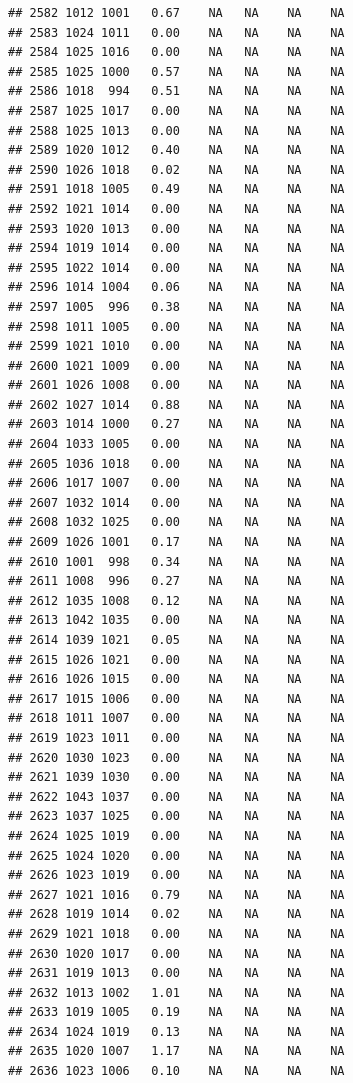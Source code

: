 \documentclass{article}\usepackage{graphicx, color}
\makeatletter
\newenvironment{kframe}{%
 \def\at@end@of@kframe{}%
 \ifinner\ifhmode%
  \def\at@end@of@kframe{\end{minipage}}%
  \begin{minipage}{\columnwidth}%
 \fi\fi%
 \def\FrameCommand##1{\hskip\@totalleftmargin \hskip-\fboxsep
 \colorbox{shadecolor}{##1}\hskip-\fboxsep
     \hskip-\linewidth \hskip-\@totalleftmargin \hskip\columnwidth}%
 \MakeFramed {\advance\hsize-\width
   \@totalleftmargin\z@ \linewidth\hsize
   \@setminipage}}%
 {\par\unskip\endMakeFramed%
 \at@end@of@kframe}
\newenvironment{knitrout}{}{} %
\makeatother
\begin{document}
\begin{knitrout}
\begin{kframe}
\begin{verbatim}
## 2582 1012 1001   0.67    NA   NA    NA    NA
## 2583 1024 1011   0.00    NA   NA    NA    NA
## 2584 1025 1016   0.00    NA   NA    NA    NA
## 2585 1025 1000   0.57    NA   NA    NA    NA
## 2586 1018  994   0.51    NA   NA    NA    NA
## 2587 1025 1017   0.00    NA   NA    NA    NA
## 2588 1025 1013   0.00    NA   NA    NA    NA
## 2589 1020 1012   0.40    NA   NA    NA    NA
## 2590 1026 1018   0.02    NA   NA    NA    NA
## 2591 1018 1005   0.49    NA   NA    NA    NA
## 2592 1021 1014   0.00    NA   NA    NA    NA
## 2593 1020 1013   0.00    NA   NA    NA    NA
## 2594 1019 1014   0.00    NA   NA    NA    NA
## 2595 1022 1014   0.00    NA   NA    NA    NA
## 2596 1014 1004   0.06    NA   NA    NA    NA
## 2597 1005  996   0.38    NA   NA    NA    NA
## 2598 1011 1005   0.00    NA   NA    NA    NA
## 2599 1021 1010   0.00    NA   NA    NA    NA
## 2600 1021 1009   0.00    NA   NA    NA    NA
## 2601 1026 1008   0.00    NA   NA    NA    NA
## 2602 1027 1014   0.88    NA   NA    NA    NA
## 2603 1014 1000   0.27    NA   NA    NA    NA
## 2604 1033 1005   0.00    NA   NA    NA    NA
## 2605 1036 1018   0.00    NA   NA    NA    NA
## 2606 1017 1007   0.00    NA   NA    NA    NA
## 2607 1032 1014   0.00    NA   NA    NA    NA
## 2608 1032 1025   0.00    NA   NA    NA    NA
## 2609 1026 1001   0.17    NA   NA    NA    NA
## 2610 1001  998   0.34    NA   NA    NA    NA
## 2611 1008  996   0.27    NA   NA    NA    NA
## 2612 1035 1008   0.12    NA   NA    NA    NA
## 2613 1042 1035   0.00    NA   NA    NA    NA
## 2614 1039 1021   0.05    NA   NA    NA    NA
## 2615 1026 1021   0.00    NA   NA    NA    NA
## 2616 1026 1015   0.00    NA   NA    NA    NA
## 2617 1015 1006   0.00    NA   NA    NA    NA
## 2618 1011 1007   0.00    NA   NA    NA    NA
## 2619 1023 1011   0.00    NA   NA    NA    NA
## 2620 1030 1023   0.00    NA   NA    NA    NA
## 2621 1039 1030   0.00    NA   NA    NA    NA
## 2622 1043 1037   0.00    NA   NA    NA    NA
## 2623 1037 1025   0.00    NA   NA    NA    NA
## 2624 1025 1019   0.00    NA   NA    NA    NA
## 2625 1024 1020   0.00    NA   NA    NA    NA
## 2626 1023 1019   0.00    NA   NA    NA    NA
## 2627 1021 1016   0.79    NA   NA    NA    NA
## 2628 1019 1014   0.02    NA   NA    NA    NA
## 2629 1021 1018   0.00    NA   NA    NA    NA
## 2630 1020 1017   0.00    NA   NA    NA    NA
## 2631 1019 1013   0.00    NA   NA    NA    NA
## 2632 1013 1002   1.01    NA   NA    NA    NA
## 2633 1019 1005   0.19    NA   NA    NA    NA
## 2634 1024 1019   0.13    NA   NA    NA    NA
## 2635 1020 1007   1.17    NA   NA    NA    NA
## 2636 1023 1006   0.10    NA   NA    NA    NA

\end{verbatim}
\end{kframe}
\end{knitrout}
\end{document}
